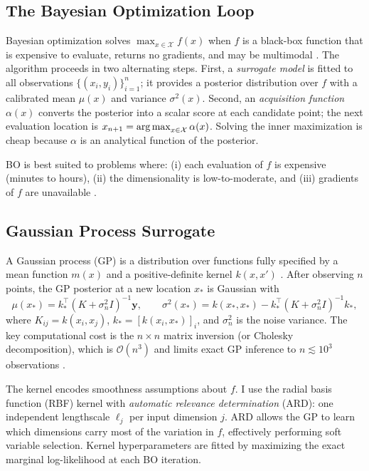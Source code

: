 \subsection{The Bayesian Optimization Loop}
\label{sec:bo-background}

Bayesian optimization solves $\max_{x \in \mathcal{X}} f(x)$ when $f$
is a black-box function that is expensive to evaluate, returns no
gradients, and may be multimodal \citep{frazier2018tutorial}.
The algorithm proceeds in two alternating steps.
First, a \emph{surrogate model} is fitted to all observations
$\{(x_i, y_i)\}_{i=1}^n$; it provides a posterior distribution over
$f$ with a calibrated mean $\mu(x)$ and variance $\sigma^2(x)$.
Second, an \emph{acquisition function} $\alpha(x)$ converts the
posterior into a scalar score at each candidate point; the next
evaluation location is $x_{n+1} = \operatorname*{arg\,max}_{x \in \mathcal{X}} \alpha(x)$.
Solving the inner maximization is cheap because $\alpha$ is an
analytical function of the posterior.

BO is best suited to problems where: (i) each evaluation of $f$ is
expensive (minutes to hours), (ii) the dimensionality is low-to-moderate,
and (iii) gradients of $f$ are unavailable
\citep{frazier2018tutorial,shahriari2016taking}.

\subsection{Gaussian Process Surrogate}
\label{sec:gp-background}

A Gaussian process (GP) is a distribution over functions fully specified
by a mean function $m(x)$ and a positive-definite kernel
$k(x, x')$ \citep{frazier2018tutorial}.
After observing $n$ points, the GP posterior at a new location $x_*$
is Gaussian with
\[
  \mu(x_*) = k_*^\top (K + \sigma_n^2 I)^{-1} \mathbf{y},
  \qquad
  \sigma^2(x_*) = k(x_*, x_*) - k_*^\top (K + \sigma_n^2 I)^{-1} k_*,
\]
where $K_{ij} = k(x_i, x_j)$, $k_* = [k(x_i, x_*)]_i$, and
$\sigma_n^2$ is the noise variance.
The key computational cost is the $n\times n$ matrix inversion (or
Cholesky decomposition), which is $\mathcal{O}(n^3)$ and limits exact
GP inference to $n \lesssim 10^3$ observations \citep{shahriari2016taking}.

The kernel encodes smoothness assumptions about $f$.
I use the radial basis function (RBF) kernel with
\emph{automatic relevance determination} (ARD): one independent
lengthscale $\ell_j$ per input dimension $j$.
ARD allows the GP to learn which dimensions carry most of the variation
in $f$, effectively performing soft variable selection.
Kernel hyperparameters are fitted by maximizing the exact marginal
log-likelihood at each BO iteration.


